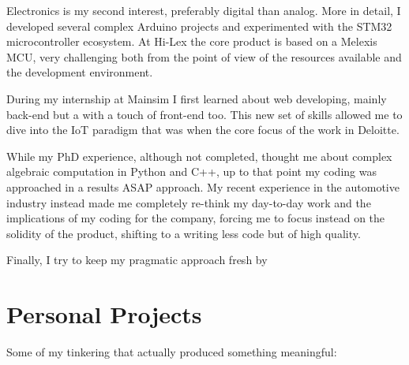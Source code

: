 \documentclass[]{friggeri-cv}
\begin{document}
	Electronics is my second interest, preferably digital than analog. More in detail, I developed several complex Arduino projects and experimented with the STM32 microcontroller ecosystem. At Hi-Lex the core product is based on a Melexis MCU, very challenging both from the point of view of the resources available and the development environment.
	
	During my internship at Mainsim I first learned about web developing, mainly back-end but a with a touch of front-end too. This new set of skills allowed me to dive into the IoT paradigm that was when the core focus of the work in Deloitte.

  While my PhD experience, although not completed, thought me about complex algebraic computation in Python and C++, up to that point my coding was approached in a results ASAP approach. My recent experience in the automotive industry instead made me completely re-think my day-to-day work and the implications of my coding for the company, forcing me to focus instead on the solidity of the product, shifting to a writing less code but of high quality.
	
  Finally, I try to keep my pragmatic approach fresh by 
	
\section{Personal Projects}

Some of my tinkering that actually produced something meaningful:
\end{document}
